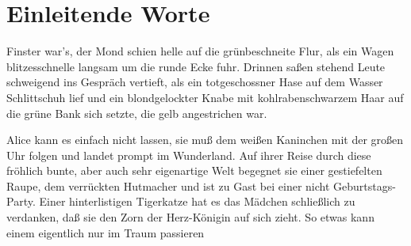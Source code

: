 \documentclass[12pt]{scrreprt}
\begin{document}
\section{Einleitende Worte}
Finster war's, der Mond schien helle auf die grünbeschneite Flur, als
ein Wagen blitzesschnelle langsam um die runde Ecke fuhr. Drinnen
saßen stehend Leute schweigend ins Gespräch vertieft, als ein
totgeschossner Hase auf dem Wasser Schlittschuh lief und ein
blondgelockter Knabe mit kohlrabenschwarzem Haar auf die grüne Bank
sich setzte, die gelb angestrichen war.

Alice kann es einfach nicht lassen, sie muß dem weißen Kaninchen mit
der großen Uhr folgen und landet prompt im Wunderland. Auf ihrer Reise
durch diese fröhlich bunte, aber auch sehr eigenartige Welt begegnet
sie einer gestiefelten Raupe, dem verrückten Hutmacher und ist zu Gast
bei einer nicht Geburtstags-Party. Einer hinterlistigen Tigerkatze hat
es das Mädchen schließlich zu verdanken, daß sie den Zorn der
Herz-Königin auf sich zieht. So etwas kann einem eigentlich nur im
Traum passieren
\end{document}
